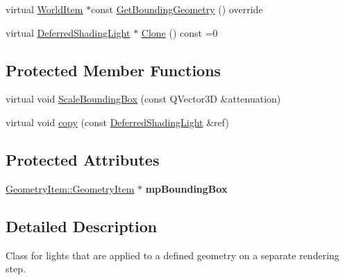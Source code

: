 \begin{DoxyCompactItemize}
\item 
virtual \mbox{\hyperlink{class_geometry_engine_1_1_geometry_world_item_1_1_world_item}{World\+Item}} $\ast$const \mbox{\hyperlink{class_geometry_engine_1_1_geometry_world_item_1_1_geometry_light_1_1_deferred_shading_light_a742416954d3b05484799e4c1235567b1}{Get\+Bounding\+Geometry}} () override
\item 
virtual \mbox{\hyperlink{class_geometry_engine_1_1_geometry_world_item_1_1_geometry_light_1_1_deferred_shading_light}{Deferred\+Shading\+Light}} $\ast$ \mbox{\hyperlink{class_geometry_engine_1_1_geometry_world_item_1_1_geometry_light_1_1_deferred_shading_light_a7ef4d7b7a41cbda01a55bcb0475484d3}{Clone}} () const =0
\end{DoxyCompactItemize}
\subsection*{Protected Member Functions}
\begin{DoxyCompactItemize}
\item 
virtual void \mbox{\hyperlink{class_geometry_engine_1_1_geometry_world_item_1_1_geometry_light_1_1_deferred_shading_light_afeb4ce0c059042c837cc853701811be9}{Scale\+Bounding\+Box}} (const Q\+Vector3D \&attenuation)
\item 
virtual void \mbox{\hyperlink{class_geometry_engine_1_1_geometry_world_item_1_1_geometry_light_1_1_deferred_shading_light_a7cab39203d583f1a4b14cb8c56fcb85b}{copy}} (const \mbox{\hyperlink{class_geometry_engine_1_1_geometry_world_item_1_1_geometry_light_1_1_deferred_shading_light}{Deferred\+Shading\+Light}} \&ref)
\end{DoxyCompactItemize}
\subsection*{Protected Attributes}
\begin{DoxyCompactItemize}
\item 
\mbox{\label{class_geometry_engine_1_1_geometry_world_item_1_1_geometry_light_1_1_deferred_shading_light_a2cdd3044d2eb7ea056031b2a54070976}} 
\mbox{\hyperlink{class_geometry_engine_1_1_geometry_world_item_1_1_geometry_item_1_1_geometry_item}{Geometry\+Item\+::\+Geometry\+Item}} $\ast$ {\bfseries mp\+Bounding\+Box}
\end{DoxyCompactItemize}


\subsection{Detailed Description}
Class for lights that are applied to a defined geometry on a separate rendering step. 

